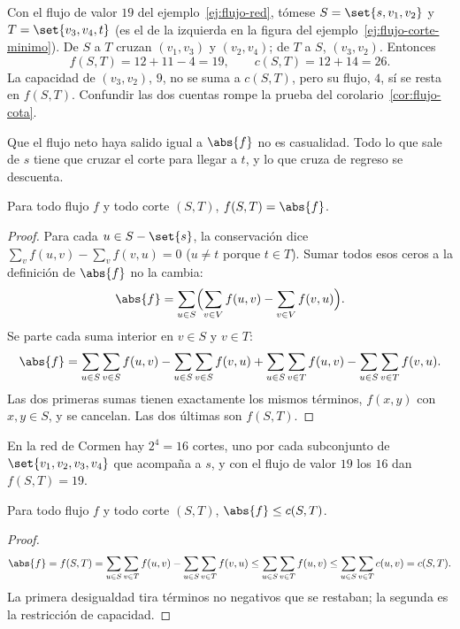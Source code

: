 \documentclass[11pt,letterpaper]{article}
\begin{document}
\begin{ejemplo}\label{ej:flujo-corte}
  Con el flujo de valor $19$ del ejemplo~\ref{ej:flujo-red}, tómese
  $S = \set{s, v_1, v_2}$ y $T = \set{v_3, v_4, t}$ (es el de la
  izquierda en la figura del ejemplo~\ref{ej:flujo-corte-minimo}). De
  $S$ a $T$ cruzan $(v_1, v_3)$ y $(v_2, v_4)$; de $T$ a $S$,
  $(v_3, v_2)$. Entonces
  \[
    f(S, T) = 12 + 11 - 4 = 19 , \qquad c(S, T) = 12 + 14 = 26 .
  \]
  La capacidad de $(v_3, v_2)$, $9$, no se suma a $c(S, T)$, pero su
  flujo, $4$, sí se resta en $f(S, T)$. Confundir las dos cuentas
  rompe la prueba del corolario~\ref{cor:flujo-cota}.
\end{ejemplo}

Que el flujo neto haya salido igual a $\abs{f}$ no es casualidad. Todo
lo que sale de $s$ tiene que cruzar el corte para llegar a $t$, y lo
que cruza de regreso se descuenta.

\begin{lema}\label{lem:flujo-neto-corte}
  Para todo flujo $f$ y todo corte $(S, T)$, $f(S, T) = \abs{f}$.
\end{lema}

\begin{proof}
  Para cada $u \in S - \set{s}$, la conservación dice
  $\sum_{v} f(u, v) - \sum_{v} f(v, u) = 0$ ($u \ne t$ porque
  $t \in T$). Sumar todos esos ceros a la definición de $\abs{f}$ no
  la cambia:
  \[
    \abs{f} = \sum_{u \in S} \Bigl( \sum_{v \in V} f(u, v)
              - \sum_{v \in V} f(v, u) \Bigr) .
  \]
  Se parte cada suma interior en $v \in S$ y $v \in T$:
  \[
    \abs{f} = \sum_{u \in S} \sum_{v \in S} f(u, v)
            - \sum_{u \in S} \sum_{v \in S} f(v, u)
            + \sum_{u \in S} \sum_{v \in T} f(u, v)
            - \sum_{u \in S} \sum_{v \in T} f(v, u) .
  \]
  Las dos primeras sumas tienen exactamente los mismos términos,
  $f(x, y)$ con $x, y \in S$, y se cancelan. Las dos últimas son
  $f(S, T)$.
\end{proof}

En la red de Cormen hay $2^4 = 16$ cortes, uno por cada subconjunto de
$\set{v_1, v_2, v_3, v_4}$ que acompaña a $s$, y con el flujo de valor
$19$ los $16$ dan $f(S, T) = 19$.

\begin{corolario}\label{cor:flujo-cota}
  Para todo flujo $f$ y todo corte $(S, T)$, $\abs{f} \le c(S, T)$.
\end{corolario}

\begin{proof}
  \[
    \abs{f} = f(S, T)
    = \sum_{u \in S} \sum_{v \in T} f(u, v)
      - \sum_{u \in S} \sum_{v \in T} f(v, u)
    \le \sum_{u \in S} \sum_{v \in T} f(u, v)
    \le \sum_{u \in S} \sum_{v \in T} c(u, v) = c(S, T) .
  \]
  La primera desigualdad tira términos no negativos que se restaban;
  la segunda es la restricción de capacidad.
\end{proof}
\end{document}
